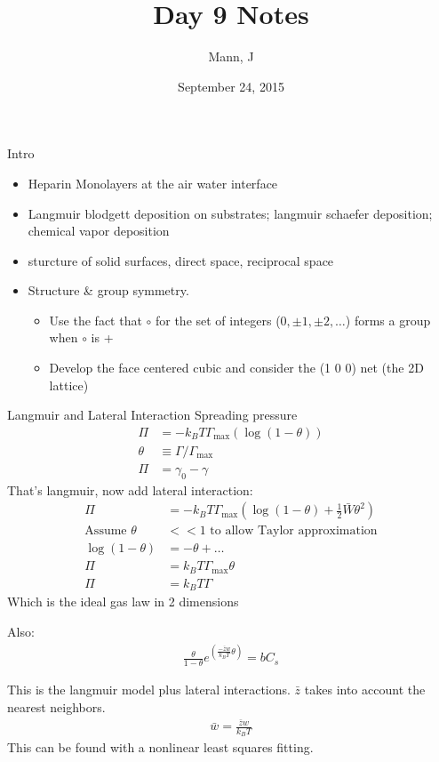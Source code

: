 \documentclass{article}
\author{Mann, J}
\title{Day 9 Notes}
\date{September 24, 2015}
\begin{document}
\maketitle{}
\begin{section}{Intro}
	\begin{itemize}
		\item Heparin Monolayers at the air water interface
		\item Langmuir blodgett deposition on substrates; langmuir schaefer deposition; chemical vapor deposition
		\item sturcture of solid surfaces, direct space, reciprocal space
		\item Structure \& group symmetry. 
			\begin{itemize}
				\item Use the fact that $\circ$ for the set of integers ($0,\pm1,\pm2,\dots$) forms a group when $\circ$ is +
				\item Develop the face centered cubic and consider the (1 0 0) net (the 2D lattice)
			\end{itemize}
	\end{itemize}
\end{section}
\begin{section}{Langmuir and Lateral Interaction}
	Spreading pressure
	\begin{align*}
		\Pi &= - k_B T \Gamma_{\text{max}}\left(\log(1-\theta)\right)\\
		\theta &\equiv \Gamma/\Gamma_\text{max}\\
		\Pi &= \gamma_0 - \gamma
	\end{align*}
	That's langmuir, now add lateral interaction:
	\begin{align*}
		\Pi &= - k_B T \Gamma_{\text{max}}\left(\log(1-\theta) + \frac{1}{2}\bar{W}\theta^2\right)\\
		\text{Assume } \theta &<< 1 \text{ to allow Taylor approximation}\\
		\log(1-\theta) &= -\theta + \ldots\\
		\Pi &= k_B T \Gamma_\text{max}\theta\\
		\Pi &= k_B T \Gamma 
	\end{align*}
Which is the ideal gas law in 2 dimensions

	Also:
	\begin{align*}
		\frac{\theta}{1-\theta}e^{\left(\frac{-\bar{z}w}{k_B T}\theta\right)} = b C_s
	\end{align*}

	This is the langmuir model plus lateral interactions. $\bar{z}$ takes into account the nearest neighbors.
	\begin{align*}
		\bar{w} = \frac{\bar{z}w}{k_B T}
	\end{align*}
This can be found with a nonlinear least squares fitting.


\end{section}
\end{document}
